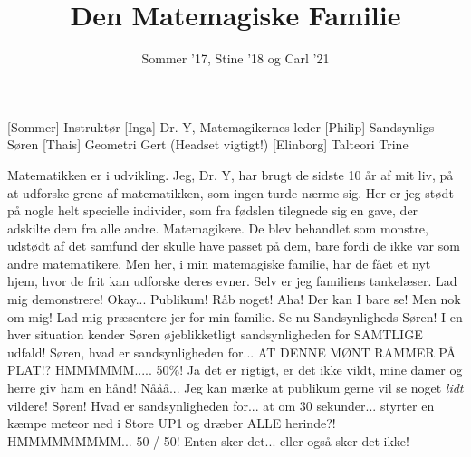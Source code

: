 \documentclass[a4paper,11pt]{article}
\title{Den Matemagiske Familie}
\author{Sommer '17, Stine '18 og Carl '21}
\begin{document}
\maketitle

\begin{roles}
[Sommer] Instruktør
[Inga] Dr. Y, Matemagikernes leder
[Philip] Sandsynligs Søren
[Thais] Geometri Gert (Headset vigtigt!)
[Elinborg] Talteori Trine
\end{roles}
\begin{sketch}
 Matematikken er i udvikling. Jeg, Dr. Y, har brugt de sidste 10 år af mit liv, på at udforske grene af matematikken, som ingen turde nærme sig. Her er jeg stødt på nogle helt specielle individer, som fra fødslen tilegnede sig en gave, der adskilte dem fra alle andre.  Matemagikere. De blev behandlet som monstre, udstødt af det samfund der skulle have passet på dem, bare fordi de ikke var som andre matematikere. Men her, i min matemagiske familie, har de fået et nyt hjem, hvor de frit kan udforske deres evner. Selv er jeg familiens tankelæser. Lad mig demonstrere!
 Okay... Publikum! Råb noget!
 Aha!  Der kan I bare se! Men nok om mig! Lad mig præsentere jer for min familie. Se nu Sandsynligheds Søren!
 I en hver situation kender Søren øjeblikketligt sandsynligheden for SAMTLIGE udfald!  Søren, hvad er sandsynligheden for...  AT DENNE MØNT RAMMER PÅ PLAT!?
  HMMMMMM..... 50\%!
 Ja det er rigtigt, er det ikke vildt, mine damer og herre giv ham en hånd!
 Nååå... Jeg kan mærke at publikum gerne vil se noget \textit{lidt} vildere! Søren! Hvad er sandsynligheden for... at om 30 sekunder... styrter  en kæmpe meteor ned i Store UP1 og dræber ALLE herinde?!
 HMMMMMMMMM... 50 / 50! Enten sker det... eller også sker det ikke!

\end{sketch}
\end{document}
